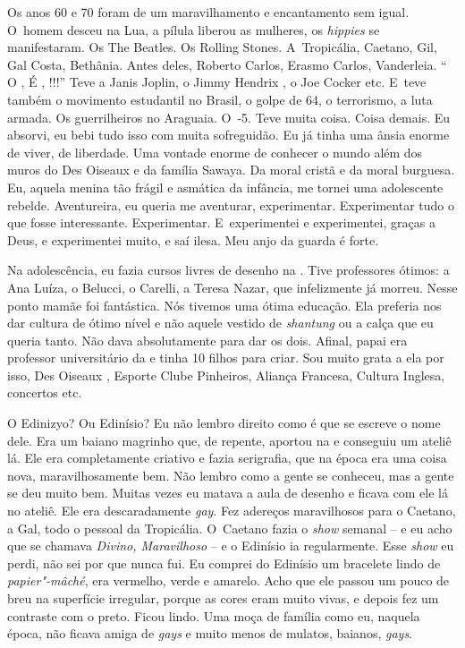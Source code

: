 Os anos 60 e 70 foram de um maravilhamento e encantamento sem igual. O~homem desceu na Lua, a pílula liberou as mulheres, os \emph{hippies} se
manifestaram. Os The Beatles. Os Rolling Stones. A~Tropicália, Caetano,
Gil, Gal Costa, Bethânia. Antes deles, Roberto Carlos, Erasmo Carlos,
Vanderleia. ``  O ,  É , !!!''
Teve a Janis Joplin, o Jimmy Hendrix , o Joe Cocker etc. E~teve também o
movimento estudantil no Brasil, o golpe de 64, o terrorismo, a luta
armada. Os guerrilheiros no Araguaia. O~-5. Teve muita coisa. Coisa
demais. Eu absorvi, eu bebi tudo isso com muita sofreguidão. Eu já tinha
uma ânsia enorme de viver, de liberdade. Uma vontade enorme de conhecer
o mundo além dos muros do Des Oiseaux e da família Sawaya. Da moral
cristã e da moral burguesa. Eu, aquela menina tão frágil e asmática da
infância, me tornei uma adolescente rebelde. Aventureira, eu queria me
aventurar, experimentar. Experimentar tudo o que fosse interessante.
Experimentar. E~experimentei e experimentei, graças a Deus, e
experimentei muito, e saí ilesa. Meu anjo da guarda é forte.

Na adolescência, eu fazia cursos livres de desenho na . Tive
professores ótimos: a Ana Luíza, o Belucci, o Carelli, a Teresa Nazar,
que infelizmente já morreu. Nesse ponto mamãe foi fantástica. Nós
tivemos uma ótima educação. Ela preferia nos dar cultura de ótimo nível
e não aquele vestido de \emph{shantung} ou a calça  que eu queria
tanto. Não dava absolutamente para dar os dois. Afinal, papai era
professor universitário da  e tinha 10 filhos para criar. Sou muito
grata a ela por isso, Des Oiseaux , Esporte Clube Pinheiros, Aliança
Francesa, Cultura Inglesa, concertos etc.

O Edinizyo? Ou Edinísio? Eu não lembro direito como é que se escreve o
nome dele. Era um baiano magrinho que, de repente, aportou na  e
conseguiu um ateliê lá. Ele era completamente criativo e fazia
serigrafia, que na época era uma coisa nova, maravilhosamente bem. Não
lembro como a gente se conheceu, mas a gente se deu muito bem. Muitas
vezes eu matava a aula de desenho e ficava com ele lá no ateliê. Ele era
descaradamente \emph{gay}. Fez adereços maravilhosos para o Caetano, a
Gal, todo o pessoal da Tropicália. O~Caetano fazia o \emph{show} semanal
-- e eu acho que se chamava \emph{Divino, Maravilhoso} -- e o Edinísio
ia regularmente. Esse \emph{show} eu perdi, não sei por que nunca fui.
Eu comprei do Edinísio um bracelete lindo de \emph{papier"-mâché}, era
vermelho, verde e amarelo. Acho que ele passou um pouco de breu na
superfície irregular, porque as cores eram muito vivas, e depois fez um
contraste com o preto. Ficou lindo. Uma moça de família como eu, naquela
época, não ficava amiga de \emph{gays} e muito menos de mulatos,
baianos, \emph{gays}.

